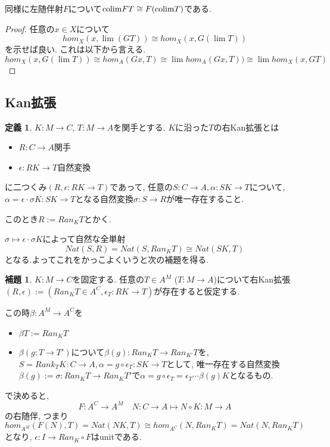 \documentclass[dvipdfmx,a4paper,11pt]{report}
\newcommand{\colim}{{\rm colim}}
\theoremstyle{definition}
\newtheorem{lem}[thm]{補題}
\newtheorem{dfn}[thm]{定義}
\begin{document}
同様に左随伴射$F$について$\colim FT \cong F(\colim T)$である.
\begin{proof}
任意の$x \in X$について
$$
hom_{X}(x, \lim (GT) ) \cong 
hom_{X}(x, G(\lim T)) 
$$
を示せば良い. これは以下から言える. 
$$
hom_{X}(x, G(\lim T)) 
\cong
hom_{A}(Gx, T) 
\cong
\lim  hom_{A}(Gx, T) )
 \cong 
\lim hom_{X}(x, GT)
$$
\end{proof}


\subsection{Kan拡張}

 \begin{tcolorbox}
 [colback = white, colframe = green!35!black, fonttitle = \bfseries,breakable = true]
\begin{dfn}
$K : M \to C$, $T : M \to A$を関手とする.
$K$に沿った$T$の右Kan拡張とは
\begin{itemize}
\item $R : C \to A$関手
\item $\epsilon : RK \to T$自然変換
\end{itemize}
に二つくみ$(R, \epsilon : RK \to T)$であって, 
任意の$S : C \to A, \alpha : SK \to T$について, $\alpha = \epsilon \cdot \sigma K : SK \to T$となる自然変換$\sigma : S \to R$が唯一存在すること. 

このとき$R := Ran_{K}T$とかく. 
\end{dfn}
\end{tcolorbox}

$\sigma \mapsto \epsilon \cdot \sigma K$によって自然な全単射
$$
Nat (S, R)=Nat (S, Ran_{K}T) \cong Nat(SK,T)
$$
となる.よってこれをかっこよくいうと次の補題を得る. 
 \begin{tcolorbox}
 [colback = white, colframe = green!35!black, fonttitle = \bfseries,breakable = true]
\begin{lem}
$K : M \to C$を固定する. 
任意の$T \in A^{M}$ ($T : M \to A$)について右Kan拡張
$(R , \epsilon) := (Ran_{K}T \in A^C, \epsilon_T : RK \to T)$が存在すると仮定する.

この時$\beta : A^M \to A^C$を
\begin{itemize}
\item $\beta T := Ran_{K}T$
\item $\beta (g : T \to T')$について$\beta(g) : Ran_{K}T \to Ran_{K'}T$を, $S = Rank_{T}K :C \to A, \alpha =g\circ \epsilon_T : SK \to T$として, 唯一存在する自然変換
$\beta(g):=\sigma :  Ran_{K}T \to Ran_{K}T'$で$\alpha =g\circ \epsilon_T  = \epsilon_T \cdots \beta(g)K$となるもの. 
\end{itemize}
で決めると, 
$$
F : A^C \to A^M \quad N :C\to A\mapsto N \circ K : M \to A 
$$
の右随伴, つまり
$$
hom_{A^M}(F(N), T) = Nat(NK,T)\cong hom_{A^C}(N, Ran_{K}T)=Nat (N, Ran_{K}T)
$$
となり, $\epsilon :  I \to Ran_{K} \circ F$はunitである. 
\end{lem}
\end{tcolorbox}
\end{document}
